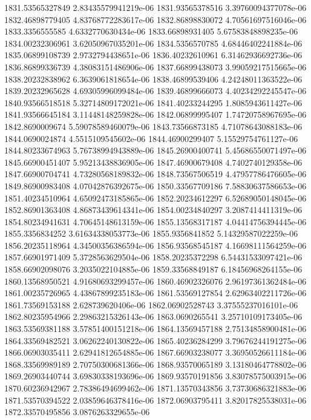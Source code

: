 {1831.53565327849 2.83435579941219e-06
1831.93565378516 3.39760094377078e-06
1832.46898779405 4.83768772283617e-06
1832.86898830072 4.70561697516046e-06
1833.3356555585 4.6332770630434e-06
1833.66898931405 5.67583848898235e-06
1834.00232306961 3.62050967035201e-06
1834.5356570785 4.68446402241884e-06
1835.06899108739 2.9732794438651e-06
1836.40232610961 6.31462936692736e-06
1836.86899336739 4.38083151486906e-06
1837.66899438073 3.99059217515665e-06
1838.20232838962 6.3639061818654e-06
1838.46899539406 4.24248011363522e-06
1839.20232965628 4.69305996099484e-06
1839.46899666073 4.40234292245547e-06
1840.93566518518 5.32714809172021e-06
1841.40233244295 1.8085943611427e-06
1841.93566645184 3.11448148259828e-06
1842.06899995407 1.74720758967695e-06
1842.8690009674 5.59078589460079e-06
1843.73566873185 4.71078643088183e-06
1844.0690024874 4.5515109545602e-06
1844.46900299407 5.15529754761127e-06
1844.80233674963 5.76738994943889e-06
1845.26900400741 5.45686550071497e-06
1845.66900451407 5.95213438836905e-06
1847.46900679408 4.7402740129358e-06
1847.66900704741 4.73280568189832e-06
1848.73567506519 4.47957786476605e-06
1849.86900983408 4.07042876392675e-06
1850.33567709186 7.58830637586653e-06
1851.40234510964 4.65092473185865e-06
1852.20234612297 6.52689050148045e-06
1852.86901363408 4.86873439614341e-06
1854.00234840297 3.2087414411319e-06
1854.80234941631 4.70645148613159e-06
1855.13568317187 4.04414756394445e-06
1855.3356834252 3.61634338053773e-06
1855.9356841852 5.14329587022259e-06
1856.20235118964 4.34500356386594e-06
1856.93568545187 4.16698111564259e-06
1857.66901971409 5.3728563629504e-06
1858.20235372298 6.54431533097421e-06
1858.66902098076 3.2035022104885e-06
1859.33568849187 6.18456968264155e-06
1860.13568950521 4.91680693299457e-06
1860.46902326076 2.96197361362484e-06
1861.00235726965 4.43867899235183e-06
1861.53569127854 2.62963402211726e-06
1861.73569153188 2.628739620406e-06
1862.06902528743 3.37555237016101e-06
1862.80235954966 2.29863215326143e-06
1863.0690265541 3.25710109173405e-06
1863.53569381188 3.57851400151218e-06
1864.13569457188 2.75134858900481e-06
1864.33569482521 3.06262240130822e-06
1865.40236284299 3.79676244191275e-06
1866.06903035411 2.62941812654885e-06
1867.66903238077 3.36950526611184e-06
1868.33569989189 2.70750300681366e-06
1868.93570065189 3.13180464778802e-06
1869.26903440744 3.69830338193696e-06
1869.93570191856 3.83078575003915e-06
1870.60236942967 2.78386494699462e-06
1871.13570343856 3.73730686321883e-06
1871.53570394522 2.03859646378416e-06
1872.06903795411 3.82017825538031e-06
1872.33570495856 3.0876263329655e-06
}
